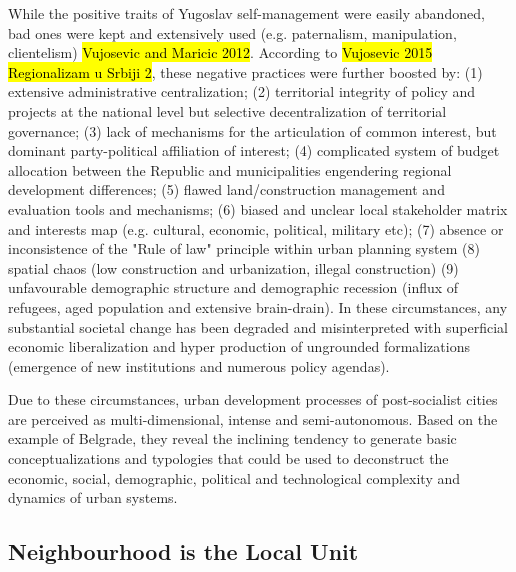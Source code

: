 \documentclass[11pt]{report}
\begin{document}
While the positive traits of Yugoslav self-management were easily abandoned, bad ones were kept and extensively used (e.g. paternalism, manipulation, clientelism) \hl{Vujosevic and Maricic 2012}.
According to \hl{Vujosevic 2015 Regionalizam u Srbiji 2}, these negative practices were further boosted by:
(1) extensive administrative centralization;
(2) territorial integrity of policy and projects at the national level but selective decentralization of territorial governance;
(3) lack of mechanisms for the articulation of common interest, but dominant party-political affiliation of interest;
(4) complicated system of budget allocation between the Republic and municipalities engendering regional development differences;
(5) flawed land/construction management and evaluation tools and mechanisms;
(6) biased and unclear local stakeholder matrix and interests map (e.g. cultural, economic, political, military etc);
(7) absence or inconsistence of the "Rule of law" principle within urban planning system
(8) spatial chaos (low construction and urbanization, illegal construction)
(9) unfavourable demographic structure and demographic recession (influx of refugees, aged population and extensive brain-drain).
In these circumstances, any substantial societal change has been  degraded  and  misinterpreted  with  superficial  economic  liberalization  and  hyper  production  of ungrounded formalizations (emergence of new institutions and numerous policy agendas). 

Due to these circumstances, urban development processes of post-socialist cities are perceived as multi-dimensional, intense and semi-autonomous.
Based on the example of Belgrade, they reveal the inclining tendency to generate basic conceptualizations and typologies that could be used to deconstruct the economic, social, demographic, political and technological complexity and dynamics of urban systems.
  
\subsection{Neighbourhood is the Local Unit}
\end{document}
